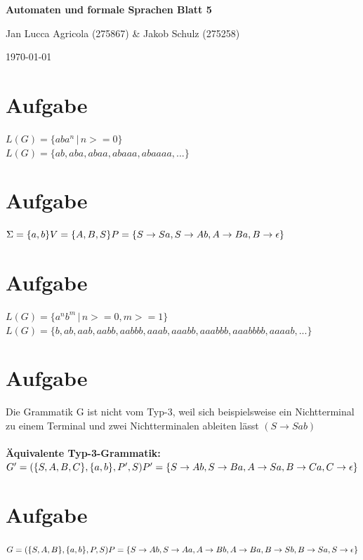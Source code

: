 \documentclass[a4paper,12pt,titlepage]{article}
\begin{document}
\begin{titlepage}
    \centering
    \vspace*{2cm}
    {\LARGE\bfseries Automaten und formale Sprachen Blatt 5\par}
    \vspace{2cm}
    {\Large Jan Lucca Agricola (275867) \& Jakob Schulz (275258)\par}
    \vspace{2cm}
    {\large\today\par}
\end{titlepage}

\section{Aufgabe}
$L(G) = \{aba^n\, |\, n >= 0\}$\\
$L(G) = \{ab, aba, abaa, abaaa, abaaaa,...\}$
\section{Aufgabe}
$\Sigma = \{a,b\}\\
V = \{A,B, S\}\\
P = \{S \rightarrow Sa, S \rightarrow Ab, A \rightarrow Ba, B \rightarrow \epsilon\}$
\section{Aufgabe}
$L(G) = \{a^nb^m\, |\, n >= 0, m>= 1\}$\\
$L(G) = \{b, ab, aab, aabb, aabbb, aaab, aaabb, aaabbb, aaabbbb, aaaab,...\}$
\section{Aufgabe}
Die Grammatik G ist nicht vom Typ-3, weil sich beispielsweise ein Nichtterminal zu einem Terminal und zwei Nichtterminalen ableiten lässt $(S \rightarrow Sab)$\\
\\
\textbf{Äquivalente Typ-3-Grammatik:}\\
$G' = (\{S, A, B, C\}, \{a, b\}, P', S)\\
P' = \{S \rightarrow Ab, S \rightarrow Ba, A \rightarrow Sa, B \rightarrow Ca, C \rightarrow \epsilon\}
$
\section{Aufgabe}
$G = (\{S, A, B\}, \{a, b\}, P, S)\\
P = \{\\S \rightarrow Ab,\\ S \rightarrow Aa,\\ A \rightarrow Bb,\\ A \rightarrow Ba,\\ B \rightarrow Sb,\\ B \rightarrow Sa,\\ S \rightarrow \epsilon\\\}
$
\end{document}
